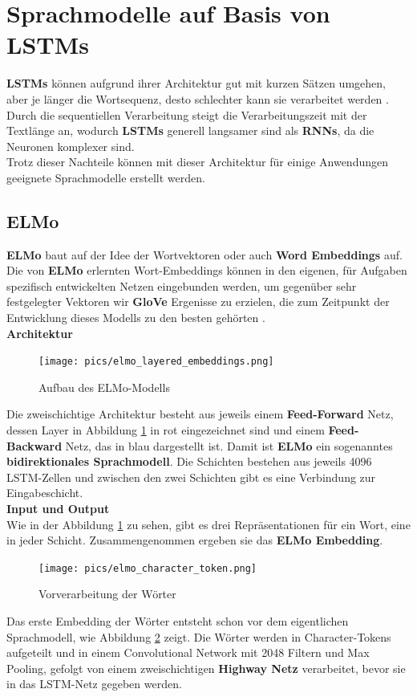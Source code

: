 \section{Sprachmodelle auf Basis von LSTMs}
\textbf{LSTMs} k\"onnen aufgrund ihrer Architektur gut mit kurzen S\"atzen umgehen, aber je l\"anger die Wortsequenz, desto schlechter kann sie verarbeitet werden \cite{gpt}.\\
Durch die sequentiellen Verarbeitung steigt die Verarbeitungszeit mit der Textl\"ange an, wodurch \textbf{LSTMs} generell langsamer sind als \textbf{RNNs}, da die Neuronen komplexer sind.\\
Trotz dieser Nachteile k\"onnen mit dieser Architektur f\"ur einige Anwendungen geeignete Sprachmodelle erstellt werden.


\subsection{ELMo}
\textbf{ELMo} baut auf der Idee der Wortvektoren oder auch \textbf{Word Embeddings} auf. Die von \textbf{ELMo} erlernten Wort-Embeddings k\"onnen in den eigenen, f\"ur Aufgaben spezifisch entwickelten Netzen eingebunden werden, um gegen\"uber sehr festgelegter Vektoren wir \textbf{GloVe} Ergenisse zu erzielen, die zum Zeitpunkt der Entwicklung dieses Modells zu den besten geh\"orten \cite{elmo}.\\

\textbf{Architektur}\\
\begin{figure}[!ht]
\centering
\texttt{[image: pics/elmo\_layered\_embeddings.png]}
\caption{Aufbau des ELMo-Modells \cite{elmoex}}
\label{fig:elmo_layers}
\end{figure}
Die zweischichtige Architektur besteht aus jeweils einem \textbf{Feed-Forward} Netz, dessen Layer in Abbildung \ref{fig:elmo_layers} in rot eingezeichnet sind und einem \textbf{Feed-Backward} Netz, das in blau dargestellt ist. Damit ist \textbf{ELMo} ein sogenanntes \textbf{bidirektionales Sprachmodell}. Die Schichten bestehen aus jeweils 4096 LSTM-Zellen und zwischen den zwei Schichten gibt es eine Verbindung zur Eingabeschicht.\\

\textbf{Input und Output}\\
Wie in der Abbildung \ref{fig:elmo_layers} zu sehen, gibt es drei Repr\"asentationen f\"ur ein Wort, eine in jeder Schicht. Zusammengenommen ergeben sie das \textbf{ELMo Embedding}.
\begin{figure}[!ht]
\centering
\texttt{[image: pics/elmo\_character\_token.png]}
\caption{Vorverarbeitung der W\"orter \cite{elmoex}}
\label{fig:elmo_character}
\end{figure}
Das erste Embedding der W\"orter entsteht schon vor dem eigentlichen Sprachmodell, wie Abbildung \ref{fig:elmo_character} zeigt. Die W\"orter werden in Character-Tokens aufgeteilt und in einem Convolutional Network mit 2048 Filtern und Max Pooling, gefolgt von einem zweischichtigen \textbf{Highway Netz} verarbeitet, bevor sie in das LSTM-Netz gegeben werden.\\

